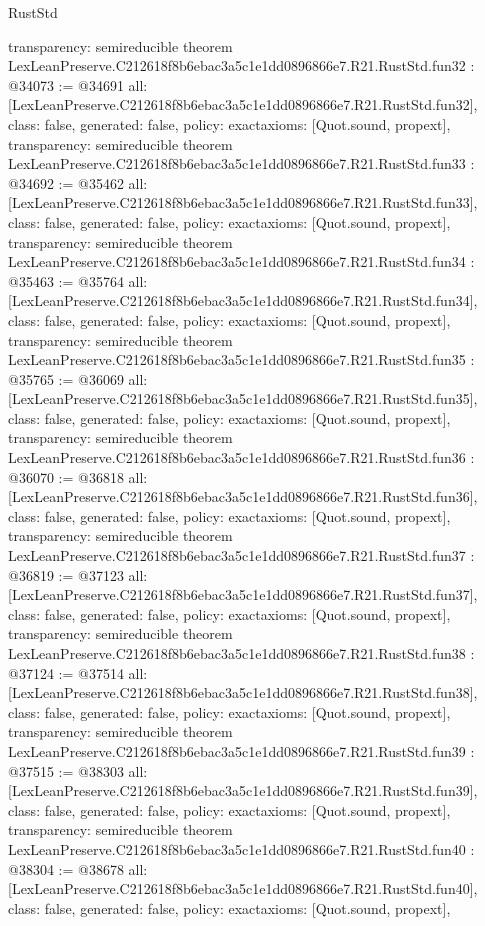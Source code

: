 \begin{lexlean}{RustStd}
\begin{coremodule}
{  transparency: semireducible
}
theorem LexLeanPreserve.C212618f8b6ebac3a5c1e1dd0896866e7.R21.RustStd.fun32 : @34073 := @34691 {
  all: [LexLeanPreserve.C212618f8b6ebac3a5c1e1dd0896866e7.R21.RustStd.fun32],
  class: false,
  generated: false,
  policy: exact{axioms: [Quot.sound, propext]},
  transparency: semireducible
}
theorem LexLeanPreserve.C212618f8b6ebac3a5c1e1dd0896866e7.R21.RustStd.fun33 : @34692 := @35462 {
  all: [LexLeanPreserve.C212618f8b6ebac3a5c1e1dd0896866e7.R21.RustStd.fun33],
  class: false,
  generated: false,
  policy: exact{axioms: [Quot.sound, propext]},
  transparency: semireducible
}
theorem LexLeanPreserve.C212618f8b6ebac3a5c1e1dd0896866e7.R21.RustStd.fun34 : @35463 := @35764 {
  all: [LexLeanPreserve.C212618f8b6ebac3a5c1e1dd0896866e7.R21.RustStd.fun34],
  class: false,
  generated: false,
  policy: exact{axioms: [Quot.sound, propext]},
  transparency: semireducible
}
theorem LexLeanPreserve.C212618f8b6ebac3a5c1e1dd0896866e7.R21.RustStd.fun35 : @35765 := @36069 {
  all: [LexLeanPreserve.C212618f8b6ebac3a5c1e1dd0896866e7.R21.RustStd.fun35],
  class: false,
  generated: false,
  policy: exact{axioms: [Quot.sound, propext]},
  transparency: semireducible
}
theorem LexLeanPreserve.C212618f8b6ebac3a5c1e1dd0896866e7.R21.RustStd.fun36 : @36070 := @36818 {
  all: [LexLeanPreserve.C212618f8b6ebac3a5c1e1dd0896866e7.R21.RustStd.fun36],
  class: false,
  generated: false,
  policy: exact{axioms: [Quot.sound, propext]},
  transparency: semireducible
}
theorem LexLeanPreserve.C212618f8b6ebac3a5c1e1dd0896866e7.R21.RustStd.fun37 : @36819 := @37123 {
  all: [LexLeanPreserve.C212618f8b6ebac3a5c1e1dd0896866e7.R21.RustStd.fun37],
  class: false,
  generated: false,
  policy: exact{axioms: [Quot.sound, propext]},
  transparency: semireducible
}
theorem LexLeanPreserve.C212618f8b6ebac3a5c1e1dd0896866e7.R21.RustStd.fun38 : @37124 := @37514 {
  all: [LexLeanPreserve.C212618f8b6ebac3a5c1e1dd0896866e7.R21.RustStd.fun38],
  class: false,
  generated: false,
  policy: exact{axioms: [Quot.sound, propext]},
  transparency: semireducible
}
theorem LexLeanPreserve.C212618f8b6ebac3a5c1e1dd0896866e7.R21.RustStd.fun39 : @37515 := @38303 {
  all: [LexLeanPreserve.C212618f8b6ebac3a5c1e1dd0896866e7.R21.RustStd.fun39],
  class: false,
  generated: false,
  policy: exact{axioms: [Quot.sound, propext]},
  transparency: semireducible
}
theorem LexLeanPreserve.C212618f8b6ebac3a5c1e1dd0896866e7.R21.RustStd.fun40 : @38304 := @38678 {
  all: [LexLeanPreserve.C212618f8b6ebac3a5c1e1dd0896866e7.R21.RustStd.fun40],
  class: false,
  generated: false,
  policy: exact{axioms: [Quot.sound, propext]},
}
\end{coremodule}
\end{lexlean}
